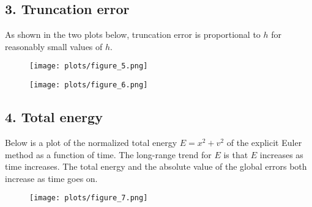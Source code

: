\documentclass{article}
\begin{document}
\subsection*{3. Truncation error}
As shown in the two plots below, truncation error is proportional to $h$ for reasonably small values of $h$.
\begin{figure}[H]
\centering
\texttt{[image: plots/figure\_5.png]}
\end{figure}

\begin{figure}[H]
\centering
\texttt{[image: plots/figure\_6.png]}
\end{figure}

\subsection*{4. Total energy}
Below is a plot of the normalized total energy $E = x^2 + v^2$ of the explicit Euler method as a function of time. The long-range trend for $E$ is that $E$ increases as time increases. The total energy and the absolute value of the global errors both increase as time goes on.

\begin{figure}[H]
\centering
\texttt{[image: plots/figure\_7.png]}
\end{figure}
\end{document}
